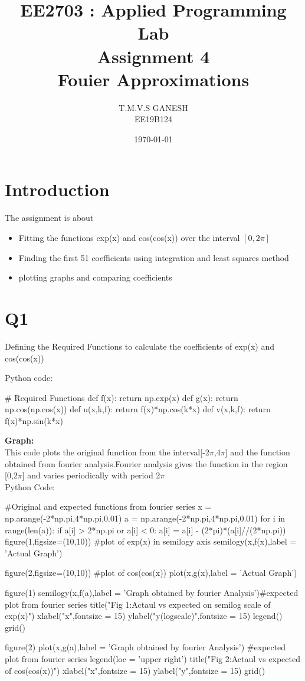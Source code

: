 \documentclass[12pt, a4paper]{report}
\title{\textbf{EE2703 : Applied Programming Lab \\ Assignment 4\\Fouier Approximations}}
\author{T.M.V.S GANESH \\ EE19B124} %
\date{\today} %
\begin{document}
		
		
\maketitle %
\section*{Introduction}
 The assignment is about 
 \begin{itemize}
  	\item Fitting the functions exp(x) and cos(cos(x)) over the interval $[0,2\pi]$
  	\item Finding the first 51 coefficients using integration and least squares method
  	\item plotting graphs and comparing coefficients
  \end{itemize}
\section*{Q1}  
  
Defining the Required Functions to calculate the coefficients of exp(x) and cos(cos(x))

Python code:
\begin{py_code}
   # Required Functions 
def f(x):
    return np.exp(x)
def g(x):
    return np.cos(np.cos(x))
def u(x,k,f):
    return f(x)*np.cos(k*x)
def v(x,k,f):
    return f(x)*np.sin(k*x)
\end{py_code}
  \textbf{Graph:} \\
This code plots the original function from the interval[-2$\pi$,4$\pi$] and the function obtained from fourier analysis.Fourier analysis gives the function in the region [0,2$\pi$] and varies periodically with period 2$\pi$\\

Python Code:
\begin{py_code}
#Original and expected functions from fourier series
x = np.arange(-2*np.pi,4*np.pi,0.01)
a = np.arange(-2*np.pi,4*np.pi,0.01)
for i in range(len(a)):
    if a[i] > 2*np.pi or a[i] < 0:
        a[i] = a[i] - (2*pi)*(a[i]//(2*np.pi))
figure(1,figsize=(10,10))    #plot of exp(x) in semilogy axis     
semilogy(x,f(x),label = 'Actual Graph')

figure(2,figsize=(10,10)) #plot of cos(cos(x))
plot(x,g(x),label = 'Actual Graph')

figure(1)
semilogy(x,f(a),label = 'Graph obtained by fourier Analysis')#expected plot from fourier series
title("Fig 1:Actaul vs expected on semilog scale of exp(x)")
xlabel("x",fontsize = 15)
ylabel("y(logscale)",fontsize = 15)
legend()
grid()

figure(2)
plot(x,g(a),label = 'Graph obtained by fourier Analysis') #expected plot from fourier series
legend(loc = 'upper right')
title("Fig 2:Actaul vs expected of cos(cos(x))")
xlabel("x",fontsize = 15)
ylabel("y",fontsize = 15)
grid() 
\end{py_code}
 
\end{document}
